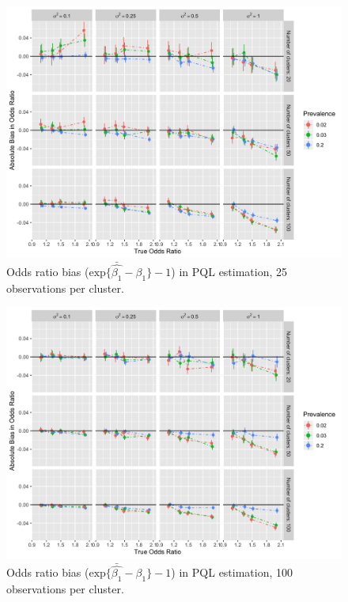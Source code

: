 \documentclass[Afour,times,sagev,doublespace]{sagej}
\begin{document}
\begin{figure}
\centering
\includegraphics[width=\linewidth]{_bias_pql_all_sbsP25.png}
  \caption{Odds ratio bias ($\text{exp} \{ \bar{\hat{\beta_1}} - \beta_1 \} - 1$) in PQL estimation, 25 observations per cluster.}
    \label{fig:_bias_pql_all_sbs_p25}
\end{figure}


\begin{figure}
\centering
\includegraphics[width=\linewidth]{_bias_pql_all_sbsP100.png}
  \caption{Odds ratio bias ($\text{exp} \{ \bar{\hat{\beta_1}} - \beta_1 \} - 1$) in PQL estimation, 100 observations per cluster.}
    \label{fig:_bias_pql_all_sbs_p100}
\end{figure}
\end{document}
